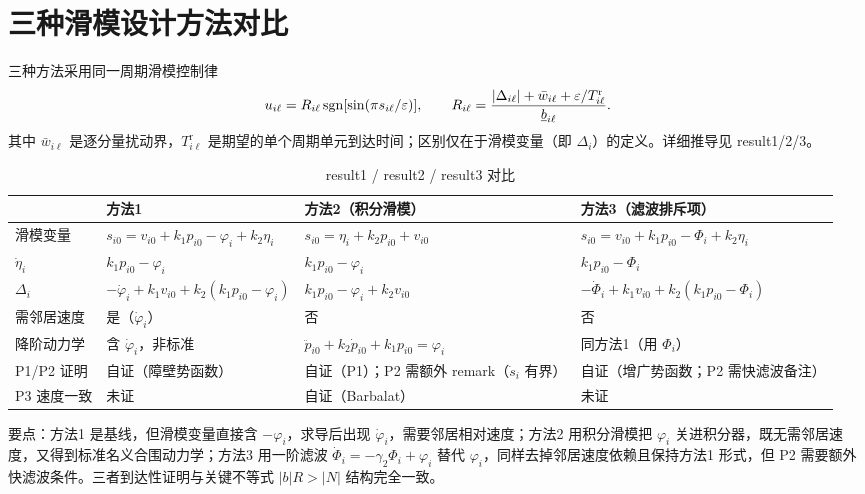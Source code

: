 
\section{三种滑模设计方法对比}

三种方法采用同一周期滑模控制律
\[
    u_{i\ell}=R_{i\ell}\operatorname{sgn}[\sin(\pi s_{i\ell}/\varepsilon)],\qquad
    R_{i\ell}=\frac{|\Delta_{i\ell}|+\bar w_{i\ell}+\varepsilon/T^{\mathrm r}_{i\ell}}{\underline{b}_{i\ell}}.
\]
其中 $\bar w_{i\ell}$ 是逐分量扰动界，$T^{\mathrm r}_{i\ell}$ 是期望的单个周期单元到达时间；区别仅在于滑模变量（即 $\Delta_i$）的定义。详细推导见 result1/2/3。

\begin{table}[H]
\centering
\caption{result1 / result2 / result3 对比}
\begin{tabular}{>{\raggedright\arraybackslash}p{2.2cm}|>{\raggedright\arraybackslash}p{3.9cm}|>{\raggedright\arraybackslash}p{3.9cm}|>{\raggedright\arraybackslash}p{3.9cm}}
\hline
& 方法1 & 方法2（积分滑模） & 方法3（滤波排斥项）\\
\hline
滑模变量 &
$s_{i0}=v_{i0}+k_1p_{i0}-\varphi_i+k_2\eta_i$ &
$s_{i0}=\eta_i+k_2p_{i0}+v_{i0}$ &
$s_{i0}=v_{i0}+k_1p_{i0}-\Phi_i+k_2\eta_i$\\
\hline
$\dot\eta_i$ &
$k_1p_{i0}-\varphi_i$ &
$k_1p_{i0}-\varphi_i$ &
$k_1p_{i0}-\Phi_i$\\
\hline
$\Delta_i$ &
$-\dot\varphi_i+k_1v_{i0}+k_2(k_1p_{i0}-\varphi_i)$ &
$k_1p_{i0}-\varphi_i+k_2v_{i0}$ &
$-\dot\Phi_i+k_1v_{i0}+k_2(k_1p_{i0}-\Phi_i)$\\
\hline
需邻居速度 &
是（$\dot\varphi_i$） &
否 &
否\\
\hline
降阶动力学 &
含 $\dot\varphi_i$，非标准 &
$\ddot p_{i0}+k_2\dot p_{i0}+k_1p_{i0}=\varphi_i$ &
同方法1（用 $\Phi_i$）\\
\hline
P1/P2 证明 &
自证（障壁势函数） &
自证（P1）；P2 需额外 remark（\(\dot s_i\) 有界） &
自证（增广势函数；P2 需快滤波备注）\\
\hline
P3 速度一致 &
未证 &
自证（Barbalat） &
未证\\
\hline
\end{tabular}
\end{table}

要点：方法1 是基线，但滑模变量直接含 $-\varphi_i$，求导后出现 $\dot\varphi_i$，需要邻居相对速度；方法2 用积分滑模把 $\varphi_i$ 关进积分器，既无需邻居速度，又得到标准名义合围动力学；方法3 用一阶滤波 $\dot\Phi_i=-\gamma_2\Phi_i+\varphi_i$ 替代 $\varphi_i$，同样去掉邻居速度依赖且保持方法1 形式，但 P2 需要额外快滤波条件。三者到达性证明与关键不等式 $|b|R>|N|$ 结构完全一致。
